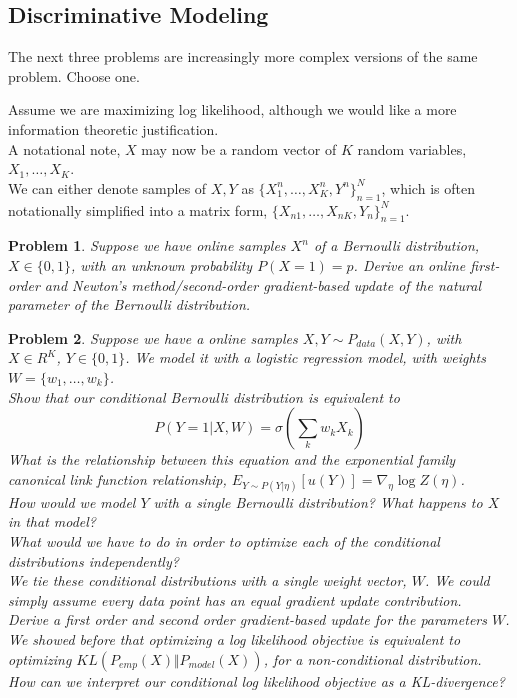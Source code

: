 \documentclass[a4paper]{article}
\newtheorem{problem}{Problem}[section]
\begin{document}
\subsection{Discriminative Modeling}
The next three problems are increasingly more complex versions of the same problem.  Choose one.

Assume we are maximizing log likelihood, although we would like a more information theoretic justification.  \\

A notational note, $X$ may now be a random vector of $K$ random variables, $X_1,\ldots,X_K$. \\
We can either denote samples of $X,Y$ as $\{X_1^n,\ldots,X_K^n,Y^n\}_{n=1}^N$, which is often notationally simplified into a matrix form, $\{X_{n1},\ldots,X_{nK},Y_n\}_{n=1}^N$.

\begin{problem}
  Suppose we have online samples $X^n$ of a Bernoulli distribution, $X \in \{0,1\}$, with an unknown probability $P(X = 1) = p$.  Derive an online first-order and Newton's method/second-order gradient-based update of the natural parameter of the Bernoulli distribution.
\end{problem}

\begin{problem}
  Suppose we have a online samples ${X,Y \sim P_{data}(X,Y)}$, with $X \in R^K$, $Y \in \{0,1\}$.  We model it with a logistic regression model, with weights $W = \{w_1,\ldots,w_k\}$. \\
  Show that our conditional Bernoulli distribution is equivalent to
  \begin{equation}
    P( Y = 1 \vert X, W) = \sigma( \sum_k w_k X_k )
    \label{logistic}
  \end{equation}
  What is the relationship between this equation and the exponential family canonical link function relationship, $E_{ Y \sim P(Y \vert \eta) } \left[ u(Y) \right] = \nabla_\eta \log Z(\eta) $. \\
  How would we model $Y$ with a single Bernoulli distribution?  What happens to $X$ in that model? \\
  What would we have to do in order to optimize each of the conditional distributions independently? \\
  We tie these conditional distributions with a single weight vector, $W$.  We could simply assume every data point has an equal gradient update contribution. \\
  Derive a first order and second order gradient-based update for the parameters $W$. \\
  We showed before that optimizing a log likelihood objective is equivalent to optimizing $KL\left( P_{emp}(X) \Vert P_{model}(X) \right)$, for a non-conditional distribution.  How can we interpret our conditional log likelihood objective as a KL-divergence?
\end{problem}
\end{document}
